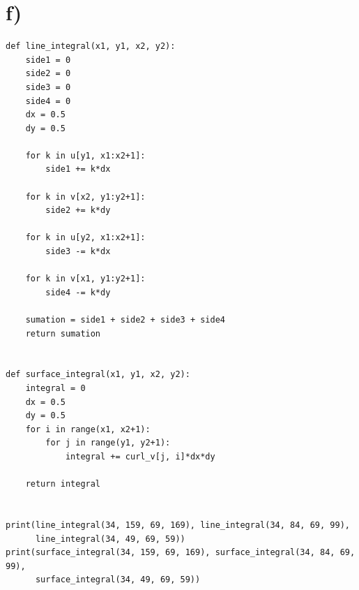 \documentclass[a4paper,10pt,norsk]{article}
\begin{document}
	\section*{f)}\label{ass:f}
\begin{lstlisting}
def line_integral(x1, y1, x2, y2):
    side1 = 0
    side2 = 0
    side3 = 0
    side4 = 0
    dx = 0.5
    dy = 0.5

    for k in u[y1, x1:x2+1]:
        side1 += k*dx

    for k in v[x2, y1:y2+1]:
        side2 += k*dy

    for k in u[y2, x1:x2+1]:
        side3 -= k*dx

    for k in v[x1, y1:y2+1]:
        side4 -= k*dy

    sumation = side1 + side2 + side3 + side4
    return sumation


def surface_integral(x1, y1, x2, y2):
    integral = 0
    dx = 0.5
    dy = 0.5
    for i in range(x1, x2+1):
        for j in range(y1, y2+1):
            integral += curl_v[j, i]*dx*dy

    return integral


print(line_integral(34, 159, 69, 169), line_integral(34, 84, 69, 99),
      line_integral(34, 49, 69, 59))
print(surface_integral(34, 159, 69, 169), surface_integral(34, 84, 69, 99),
      surface_integral(34, 49, 69, 59))
\end{lstlisting}
\end{document}
